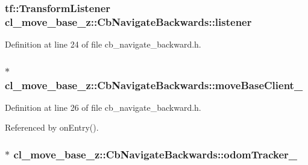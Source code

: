 \subsubsection[{\texorpdfstring{listener}{listener}}]{\setlength{\rightskip}{0pt plus 5cm}tf\+::\+Transform\+Listener cl\+\_\+move\+\_\+base\+\_\+z\+::\+Cb\+Navigate\+Backwards\+::listener}\hypertarget{classcl__move__base__z_1_1CbNavigateBackwards_a86be71ac1dd72f318875bee13259f3da}{}\label{classcl__move__base__z_1_1CbNavigateBackwards_a86be71ac1dd72f318875bee13259f3da}


Definition at line 24 of file cb\+\_\+navigate\+\_\+backward.\+h.

\subsubsection[{\texorpdfstring{move\+Base\+Client\+\_\+}{moveBaseClient_}}]{$\ast$ cl\+\_\+move\+\_\+base\+\_\+z\+::\+Cb\+Navigate\+Backwards\+::move\+Base\+Client\+\_\+}\hypertarget{classcl__move__base__z_1_1CbNavigateBackwards_a943c1a790eac9266adf11fbdc078f03a}{}\label{classcl__move__base__z_1_1CbNavigateBackwards_a943c1a790eac9266adf11fbdc078f03a}


Definition at line 26 of file cb\+\_\+navigate\+\_\+backward.\+h.



Referenced by on\+Entry().

\subsubsection[{\texorpdfstring{odom\+Tracker\+\_\+}{odomTracker_}}]{$\ast$ cl\+\_\+move\+\_\+base\+\_\+z\+::\+Cb\+Navigate\+Backwards\+::odom\+Tracker\+\_\+}\hypertarget{classcl__move__base__z_1_1CbNavigateBackwards_a75a8ae7aef6c72e96f4037c4941b0341}{}\label{classcl__move__base__z_1_1CbNavigateBackwards_a75a8ae7aef6c72e96f4037c4941b0341}


